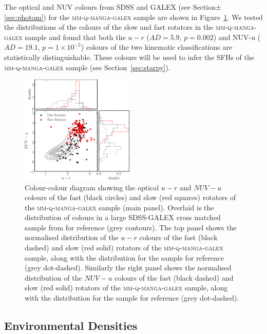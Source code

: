 \documentclass[useAMS,usenatbib]{mn2e}
\begin{document}
The optical and NUV colours from SDSS and GALEX (see Section±\ref{sec:photom}) for the \textsc{mm-q-manga-galex} sample are shown in Figure~\ref{fig:colcol}. We tested the distributions of the colours of the slow and fast rotators in the \textsc{mm-q-manga-galex} sample and found that both the $u-r$ ($AD= 5.9$, $p = 0.002$) and NUV-u ($AD= 19.1$, $p = 1\times10^{-5}$) colours of the two kinematic classifications are statistically distinguishable. These colours will be used to infer the SFHs of the \textsc{mm-q-manga-galex} sample (see Section~\ref{sec:starpy}).

\begin{figure}
\centering
\includegraphics[width=0.48\textwidth]{../figures/colour_colour_FR_SR_VOR10_nonkdc.pdf}
\caption{Colour-colour diagram showing the optical $u-r$ and $NUV-u$ colours of the fast (black circles) and slow (red squares) rotators of the \textsc{mm-q-manga-galex} sample (main panel). Overlaid is the distribution of colours in a large SDSS-GALEX cross matched sample from \protect\cite{smethurst15} for reference (grey contours). The top panel shows the normalised distribution of the $u-r$ colours of the fast (black dashed) and slow (red solid) rotators of the \textsc{mm-q-manga-galex} sample, along with the distribution for the \protect\cite{smethurst15} sample for reference (grey dot-dashed). Similarly the right panel shows the normalised distribution of the $NUV-u$ colours of the fast (black dashed) and slow (red solid) rotators of the \textsc{mm-q-manga-galex} sample, along with the distribution for the \protect\cite{smethurst15} sample for reference (grey dot-dashed).}
\label{fig:colcol}
\end{figure} 

\subsection{Environmental Densities}
\end{document}
